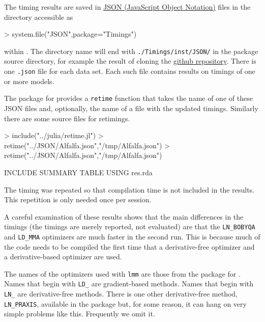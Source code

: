 \documentclass[article]{jss}
\begin{document}
The timing results are saved in \href{http://json.org}{JSON (JavaScript
Object Notation)} files in the directory accessible as

\begin{Schunk}
\begin{Sinput}
> system.file("JSON",package="Timings")
\end{Sinput}
\end{Schunk}

within . The directory name will end with
\texttt{./Timings/inst/JSON/} in the package source directory, for
example the result of cloning the
\href{https://github.com/Stat990-033/Timings}{github repository}. There
is one \texttt{.json} file for each data set. Each such file contains
results on timings of one or more models.

The  package for  provides a \texttt{retime}
function that takes the name of one of these JSON files and, optionally,
the name of a file with the updated timings. Similarly there are some
source files for  retimings.

\begin{Schunk}
\begin{Sinput}
> include("../julia/retime.jl")
> retime("../JSON/Alfalfa.json","/tmp/Alfalfa.json")
> retime("../JSON/Alfalfa.json","/tmp/Alfalfa.json")
\end{Sinput}
\end{Schunk}


INCLUDE SUMMARY TABLE USING res.rda

  The timing was repeated so that compilation time is not included in the
results. This repetition is only needed once per session.

A careful examination of these results shows that the main differences
in the  timings (the  timings are merely reported, not evaluated)
are that the \texttt{LN\_BOBYQA} and \texttt{LD\_MMA} optimizers are
much faster in the second run. This is because much of the code needs to
be compiled the first time that a derivative-free optimizer and a
derivative-based optimizer are used.

The names of the optimizers used with \texttt{lmm} are those from the
 package for . Names that begin with \texttt{LD\_} are gradient-based
methods. Names that begin with \texttt{LN\_} are derivative-free
methods. There is one other derivative-free method, \texttt{LN\_PRAXIS},
available in the  package but, for some reason, it can
hang on very simple problems like this. Frequently we omit it.
\end{document}

